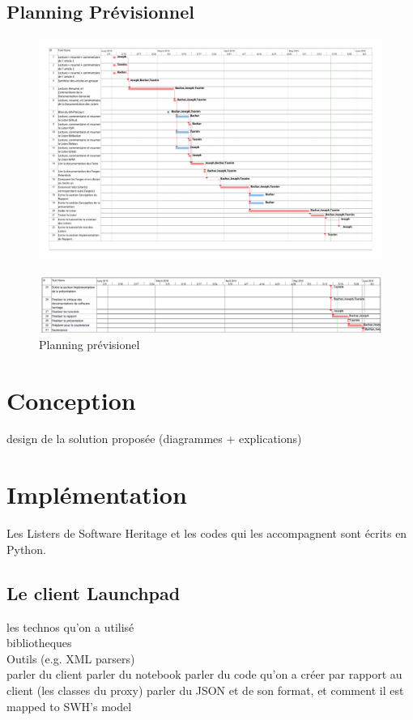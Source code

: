 \documentclass[12pt,a4paper]{report}
\theoremstyle{definition}
\begin{document}
\section{Planning Prévisionnel}
\begin{figure}[!ht]
\hspace*{-3.5cm}
\includegraphics[scale=0.48]{pdfs/feuille_de_route.pdf}
\end{figure}

\begin{figure}[!ht]
\hspace*{-3cm}
\includegraphics[scale=0.57]{images/planning_prev_p2.PNG}
\caption{Planning prévisionel}
\end{figure}

\chapter{Conception}
design de la solution proposée (diagrammes + explications)

\chapter{Implémentation}
	Les Listers de Software Heritage et les codes qui les accompagnent sont écrits en Python.

	\section{Le client Launchpad}
	les technos qu'on a utilisé\\
	bibliotheques\\
	Outils (e.g. XML parsers)\\
	parler du client
	parler du notebook
	parler du code qu'on a créer par rapport au client (les classes du proxy)
	parler du JSON et de son format, et comment il est mapped to SWH's model
\end{document}

